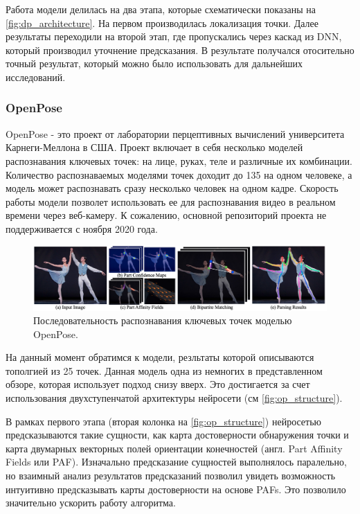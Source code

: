 Работа модели делилась на два этапа, которые схематически показаны на \autoref{fig:dp_architecture}. На первом производилась локализация точки. Далее результаты переходили на второй этап, где пропускались через каскад из DNN, который производил уточнение предсказания. В результате получался отосительно точный результат, который можно было использовать для дальнейших исследований.


\subsubsection*{OpenPose}

OpenPose - это проект от лаборатории перцептивных вычислений университета Карнеги-Меллона в США. Проект включает в себя несколько моделей распознавания ключевых точек: на лице, руках, теле и различные их комбинации. Количество распознаваемых моделями точек доходит до 135 на одном человеке, а модель может распознавать сразу несколько человек на одном кадре. Скорость работы модели позволет использовать ее для распознавания видео в реальном времени через веб-камеру. К сожалению, основной репозиторий проекта не поддерживается с ноября 2020 года.

\begin{figure}[h]
	\centering
	\includegraphics[width=\textwidth]{./images/OpenPose/structure}
	\caption{Последовательность распознавания ключевых точек моделью OpenPose. \cite{OpenPose}}
	\label{fig:op_structure}
\end{figure}

На данный момент обратимся к модели, резльтаты которой описываются тополгией из 25 точек. Данная модель одна из немногих в представленном обзоре, которая использует подход снизу вверх. Это достигается за счет использования двухступенчатой архитектуры нейросети (см \autoref{fig:op_structure}). 
 
В рамках первого этапа (вторая колонка на \autoref{fig:op_structure}) нейросетью предсказываются такие сущности, как карта достоверности обнаружения точки и карта двумарных векторных полей ориентации конечностей (англ. Part Affinity Fields или PAF). Изначально предсказание сущностей выполнялось паралельно, но взаимный анализ результатов предсказаний позволил увидеть возможность интуитивно предсказывать карты достоверности на основе PAFs. Это позволило значительно ускорить работу алгоритма.


